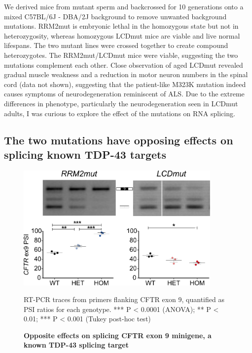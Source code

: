 We derived mice from mutant sperm and backcrossed for 10 generations onto a mixed C57BL/6J - DBA/2J background to remove unwanted background mutations.
RRM2mut is embryonic lethal in the homozygous state but not in heterozygosity, whereas homozygous LCDmut mice are viable and live normal lifespans. 
The two mutant lines were crossed together to create compound heterozygotes.
The RRM2mut/LCDmut mice were viable, suggesting the two mutations complement each other.
Close observation of aged LCDmut revealed gradual muscle weakness and a reduction in motor neuron numbers in the spinal cord (data not shown), suggesting that the patient-like M323K mutation indeed causes symptoms of neurodegeneration reminiscent of ALS. 
Due to the extreme differences in phenotype, particularly the neurodegeneration seen in LCDmut adults, I was curious to explore the effect of the mutations on RNA splicing.

\subsection{The two mutations have opposing effects on splicing known TDP-43 targets}

\begin{figure}[h!]
	\centering
	\includegraphics[width=10cm]{Figures/05_tdp_mice/CFTR.png}
	\caption{\textbf{Opposite effects on splicing CFTR exon 9 minigene, a known TDP-43 splicing target}}
	RT-PCR traces from primers flanking CFTR exon 9, quantified as PSI ratios for each genotype. *** P < 0.0001 (ANOVA); ** P < 0.01; *** P < 0.001 (Tukey post-hoc test)	
	\label{fig:CFTR}
\end{figure}

